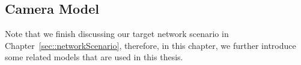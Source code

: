 \subsection{Camera Model}
\label{sec::dataModel}
Note that we finish discussing our target network scenario in Chapter~\ref{sec::networkScenario}, therefore, in this chapter, we further introduce some related models that are used in this thesis.
%
%
